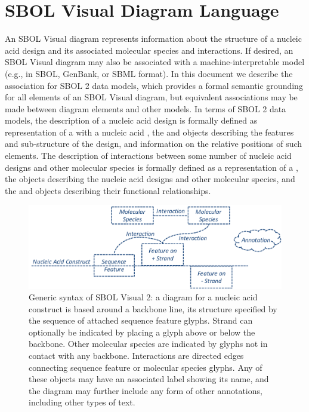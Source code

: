 \section{SBOL Visual Diagram Language}
\label{sec:language}

An SBOL Visual diagram represents information about the structure of a nucleic acid design and its associated molecular species and interactions.
%
If desired, an SBOL Visual diagram may also be associated with a machine-interpretable model (e.g., in SBOL, GenBank, or SBML format).
In this document we describe the association for SBOL 2 data models, which provides a formal semantic grounding for all elements of an SBOL Visual diagram, but equivalent associations may be made between diagram elements and other models.
%
In terms of SBOL 2 data models, the description of a nucleic acid design is formally defined as representation of a  with a nucleic acid , the  and  objects describing the features and sub-structure of the design, and  information on the relative positions of such elements.
%
The description of interactions between some number of nucleic acid designs and other molecular species is formally defined as a representation of a , the  objects describing the nucleic acid designs and other molecular species, and the  and  objects describing their functional relationships.

\begin{figure}[h!]
\centering
\includegraphics[width=6in]{figures/SBOLsyntax.pdf}
\caption{Generic syntax of SBOL Visual 2:  
a diagram for a nucleic acid construct is based around a backbone line, its structure specified by the sequence of attached sequence feature glyphs.  
Strand can optionally be indicated by placing a glyph above or below the backbone.  
Other molecular species are indicated by glyphs not in contact with any backbone.
Interactions are directed edges connecting sequence feature or molecular species glyphs.
Any of these objects may have an associated label showing its name, and the diagram may further include any form of other annotations, including other types of text.}
\label{f:syntax}
\end{figure}

